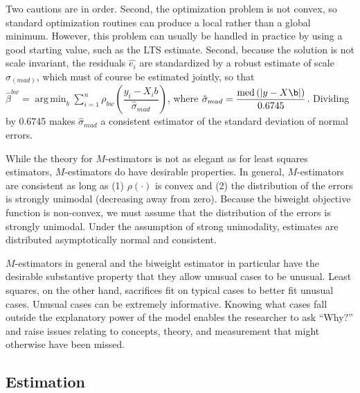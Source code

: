 \documentclass[12pt]{article}
\DeclareMathOperator*{\argmin}{arg\,min}
\DeclareMathOperator{\med}{med}
\begin{document}
Two cautions are in order. Second, the optimization problem is not convex, so standard optimization routines can produce a local rather than a global minimum. However, this problem can usually be handled in practice by using a good starting value, such as the LTS estimate. Second, because the solution is not scale invariant, the residuals $\hat{e_i}$ are standardized by a robust estimate of scale $\hat{\sigma}_{(mad)}$, which must of course be estimated jointly, so that $\hat{\beta}^{bw} =\argmin_{b} \sum_{i = 1}^n \rho_{bw}\left(\dfrac{y_i - X_ib}{\hat{\sigma}_{mad}}\right)$, where $\hat{\sigma}_{mad} = \dfrac{\med\left( |y - X\b|\right)}{0.6745}$. Dividing by 0.6745 makes $\hat{\sigma}_{mad}$ a consistent estimator of the standard deviation of normal errors.

While the theory for $M$-estimators is not as elegant as for least squares estimators, $M$-estimators do have desirable properties. In general, $M$-estimators are consistent as long as (1) $\rho(\cdot)$ is convex and (2) the distribution of the errors is strongly unimodal (decreasing away from zero). Because the biweight objective function is non-convex, we must assume that the distribution of the errors is strongly unimodal. Under the assumption of strong unimodality, estimates are distributed asymptotically normal and consistent.

$M$-estimators in general and the biweight estimator in particular have the desirable substantive property that they allow unusual cases to be unusual. Least squares, on the other hand, sacrifices fit on typical cases to better fit unusual cases. Unusual cases can be extremely informative. Knowing what cases fall outside the explanatory power of the model enables the researcher to ask ``Why?'' and raise issues relating to concepts, theory, and measurement that might otherwise have been missed.

\subsection*{Estimation}
\end{document}
